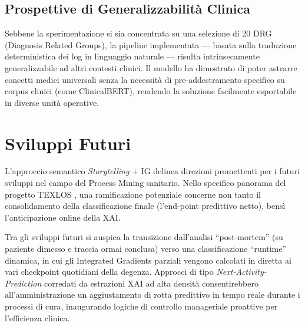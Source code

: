 \subsection{Prospettive di Generalizzabilità Clinica}
Sebbene la sperimentazione si sia concentrata su una selezione di 20 DRG (Diagnosis Related Groups), la pipeline implementata — basata sulla traduzione deterministica dei log in linguaggio naturale — risulta intrinsecamente generalizzabile ad altri contesti clinici. Il modello ha dimostrato di poter astrarre concetti medici universali senza la necessità di pre-addestramento specifico su corpus clinici (come ClinicalBERT), rendendo la soluzione facilmente esportabile in diverse unità operative.

\section{Sviluppi Futuri}
L'approccio semantico \textit{Storytelling} + IG delinea direzioni promettenti per i futuri sviluppi nel campo del Process Mining sanitario. Nello specifico panorama del progetto TEXLOS \cite{texlos2026}, una ramificazione potenziale concerne non tanto il consolidamento della classificazione finale (l'end-point predittivo netto), bensì l'anticipazione online della XAI.

Tra gli sviluppi futuri si auspica la transizione dall'analisi ``post-mortem'' (su paziente dimesso e traccia ormai conclusa) verso una classificazione ``runtime'' dinamica, in cui gli Integrated Gradients parziali vengono calcolati in diretta ai vari checkpoint quotidiani della degenza. Approcci di tipo \textit{Next-Activity-Prediction} corredati da estrazioni XAI ad alta densità consentirebbero all'amministrazione un aggiustamento di rotta predittivo in tempo reale durante i processi di cura, inaugurando logiche di controllo manageriale proattive per l'efficienza clinica.
